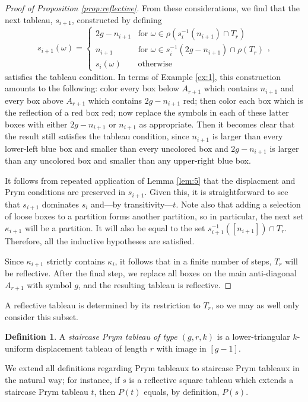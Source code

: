 \documentclass[11pt,reqno]{amsart}
\newcommand*{\inv}[1]{#1^{-1}}
\theoremstyle{definition}
\newtheorem{definition}{Definition}[section]
\theoremstyle{problem}
\theoremstyle{plain}
\theoremstyle{remark}
\theoremstyle{theorem}
\numberwithin{equation}{section}
\numberwithin{figure}{section}
\begin{document}
\begin{proof}[Proof of Proposition \ref{prop:reflective}]
  From these considerations, we find that the next tableau, $s_{i+1}$,
  constructed by defining
  \begin{equation}
    \label{eq:10}
    s_{i+1}(\omega) = 
    \begin{cases}
      2g - n_{i+1} &
      \text{for } \omega \in \rho(\inv s_i(n_{i+1}) \cap T_r) \\
      n_{i+1} &
      \text{for } \omega \in \inv s_i(2g-n_{i+1}) \cap \rho(T_r) \\
      s_i(\omega) & \text{otherwise }
    \end{cases},
  \end{equation}
  satisfies the tableau condition.  In terms of Example \ref{ex:1}, this
  construction amounts to the following: color every box below
  $A_{r+1}$ which contains $n_{i+1}$ and every box above $A_{r+1}$
  which contains $2g - n_{i+1}$ red; then color each box which is the
  reflection of a red box red; now replace the symbols in each of
  these latter boxes with either $2g-n_{i+1}$ or $n_{i+1}$ as
  appropriate.  Then it becomes clear that the result still satisfies
  the tableau condition, since $n_{i+1}$ is larger than every lower-left
  blue box and smaller than every uncolored box and $2g-n_{i+1}$ is
  larger than any uncolored box and smaller than any upper-right blue
  box.

  It follows from repeated application of Lemma \ref{lem:5} that the
  displacment and Prym conditions are preserved in $s_{i+1}$.  Given
  this, it is straightforward to see that $s_{i+1}$ dominates $s_i$
  and---by transitivity---$t$.  Note also that adding a selection of
  loose boxes to a partition forms another partition, so in
  particular, the next set $\kappa_{i+1}$ will be a partition.  It
  will also be equal to the set $\inv s_{i+1} ([n_{i+1}]) \cap T_r$.
  Therefore, all the inductive hypotheses are satisfied.

  Since $\kappa_{i+1}$ strictly contains $\kappa_{i}$, it follows that
  in a finite number of steps, $T_r$ will be reflective.  After the
  final step, we replace all boxes on the main anti-diagonal $A_{r+1}$
  with symbol $g$, and the resulting tableau is reflective.
\end{proof}

A reflective tableau is determined by its restriction to
$T_r$, so we may as well only consider this subset. 

\begin{definition}
A \textit{staircase Prym tableau of type $(g,r,k)$} is
 a lower-triangular $k$-uniform displacement tableau of length $r$ with image
in $[g-1]$.  
\end{definition}
We extend all definitions regarding Prym tableaux to
staircase Prym tableaux in the natural way; for instance, if $s$ is a reflective square tableau which extends a
staircase Prym tableau $t$, then $P(t)$ equals, by definition, $P(s)$.
\end{document}
